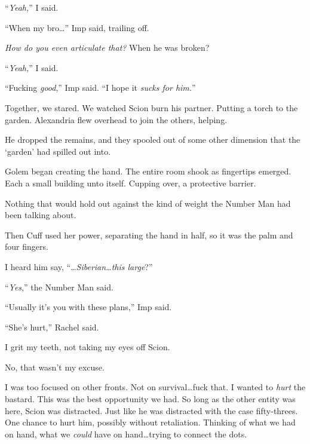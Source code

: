 ``\emph{Yeah,}'' I said.



``When my bro\ldots'' Imp said, trailing off.



\emph{How do you even articulate that?}  When he was broken?



``\emph{Yeah,}'' I said.



``Fucking \emph{good},'' Imp said.  ``I hope it \emph{sucks for him.}''



Together, we stared.  We watched Scion burn his partner.  Putting a torch to the garden.  Alexandria flew overhead to join the others, helping.



He dropped the remains, and they spooled out of some other dimension that the `garden' had spilled out into.



Golem began creating the hand.  The entire room shook as fingertips emerged.  Each a small building unto itself.  Cupping over, a protective barrier.



Nothing that would hold out against the kind of weight the Number Man had been talking about.



Then Cuff used her power, separating the hand in half, so it was the palm and four fingers.



I heard him say, ``\ldots\emph{Siberian\ldots this large}?''



``\emph{Yes},'' the Number Man said.



``Usually it's you with these plans,'' Imp said.



``She's hurt,'' Rachel said.



I grit my teeth, not taking my eyes off Scion.



No, that wasn't my excuse.



I was too focused on other fronts.  Not on survival\ldots fuck that.  I wanted to \emph{hurt} the bastard.  This was the best opportunity we had.  So long as the other entity was here, Scion was distracted.  Just like he was distracted with the case fifty-threes.  One chance to hurt him, possibly without retaliation.  Thinking of what we had on hand, what we \emph{could} have on hand\ldots trying to connect the dots.



